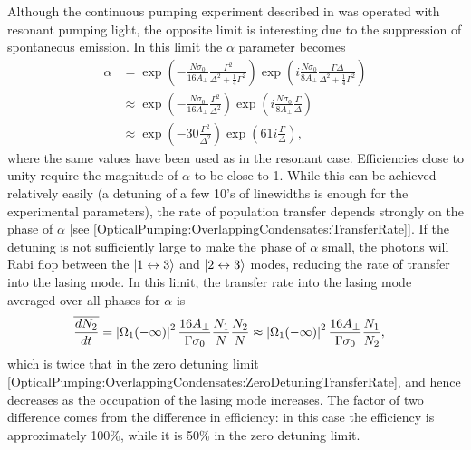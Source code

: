 Although the continuous pumping experiment described in  was operated with resonant pumping light, the opposite limit is interesting due to the suppression of spontaneous emission.  In this limit the $\alpha$ parameter becomes
\begin{align}
    \alpha &= \exp\left( - \frac{N \sigma_0}{16 A_\perp} \frac{\Gamma^2}{\Delta^2 + \frac{1}{4}\Gamma^2}\right) \exp \left(i \frac{N \sigma_0}{8 A_\perp} \frac{\Gamma \Delta}{\Delta^2 + \frac{1}{4} \Gamma^2}\right) \\
    &\approx \exp \left( - \frac{N \sigma_0}{16 A_\perp} \frac{\Gamma^2}{\Delta^2}\right) \exp \left(i \frac{N \sigma_0}{8 A_\perp} \frac{\Gamma}{\Delta}\right) \\
    &\approx \exp \left( - 30 \frac{\Gamma^2}{\Delta^2}\right) \exp \left( 61 i \frac{\Gamma}{\Delta} \right) \label{OpticalPumping:FarDetunedLimit:ApproxAlphaNumerical},
\end{align}
where the same values have been used as in the resonant case.  Efficiencies close to unity require the magnitude of $\alpha$ to be close to 1.  While this can be achieved relatively easily (a detuning of a few 10's of linewidths is enough for the experimental parameters), the rate of population transfer depends strongly on the phase of $\alpha$ [see \eqref{OpticalPumping:OverlappingCondensates:TransferRate}].  If the detuning is not sufficiently large to make the phase of $\alpha$ small, the photons will Rabi flop between the ${\left|1 \leftrightarrow 3\right>}$ and ${\left|2 \leftrightarrow 3\right>}$ modes, reducing the rate of transfer into the lasing mode.  In this limit, the transfer rate into the lasing mode averaged over all phases for $\alpha$ is
\begin{align}
    \overline{\frac{d N_2}{dt}} &= \abs{\Omega_1(-\infty)}^2 \frac{16 A_\perp}{\Gamma \sigma_0} \frac{N_1}{N} \frac{N_2}{N} \approx \abs{\Omega_1(-\infty)}^2 \frac{16 A_\perp}{\Gamma \sigma_0} \frac{N_1}{N_2}, \label{OpticalPumping:OverlappingCondensates:IntermediateDetuningTransferRate}
\end{align}
which is twice that in the zero detuning limit \eqref{OpticalPumping:OverlappingCondensates:ZeroDetuningTransferRate}, and hence decreases as the occupation of the lasing mode increases.  The factor of two difference comes from the difference in efficiency: in this case the efficiency is approximately 100\%, while it is 50\% in the zero detuning limit.

